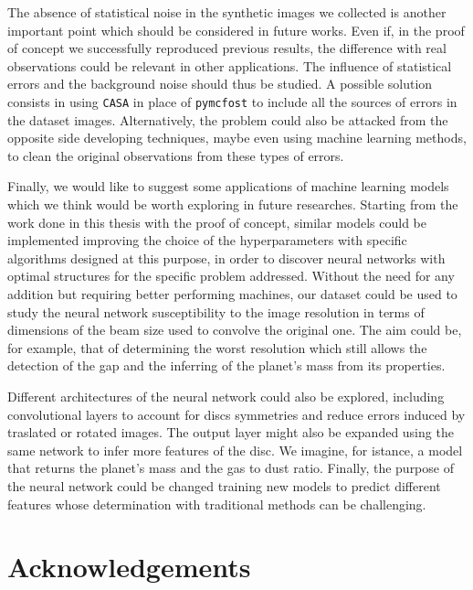 \documentclass[a4paper,10pt]{report}
\begin{document}
The absence of statistical noise in the synthetic images we collected is another important point
which should be considered in future works. Even if, 
in the proof of concept we successfully reproduced previous results, the difference with real observations 
could be relevant in other applications.
The influence of statistical errors and the background noise should thus be studied.
A possible solution consists in using \lstinline{CASA} in place of \lstinline{pymcfost} to 
include all the sources of errors in the dataset images. Alternatively,
the problem could also be attacked from the opposite side developing techniques,
maybe even using machine learning methods, to clean the original observations from these types of errors.

Finally, we would like to suggest some applications of machine learning
models which we think would be worth exploring in future researches.
Starting from the work done in this thesis with the proof of concept, similar 
models could be implemented improving the choice of the hyperparameters with 
specific algorithms designed at this purpose, in order to discover neural networks
with optimal structures for the specific problem addressed.
Without the need for any addition but requiring better performing machines, our 
dataset could be used to study the neural network susceptibility to the image resolution in terms of dimensions of
the beam size used to convolve the original one. The aim could be, for example, that of determining the worst resolution which
still allows the detection of the gap and the inferring of the planet's mass from its properties.

Different architectures of the neural network could also be explored, including convolutional
layers to account for discs symmetries and reduce errors induced by traslated or rotated images.
The output layer might also be expanded using the same network to infer more features of the disc. We imagine, 
for istance, a model that returns the planet's mass and the gas to dust ratio. Finally, the purpose of the neural network
could be changed training new models to predict different features whose determination
with traditional methods can be challenging.

\chapter*{Acknowledgements}




\nocite{*}



\end{document}
